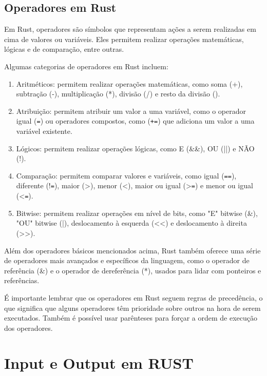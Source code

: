 \documentclass[12pt,a4paper,oneside]{abntex2}
\begin{document}
\subsection{Operadores em Rust}

Em Rust, operadores são símbolos que representam ações a serem realizadas em cima de valores ou variáveis. Eles permitem realizar operações matemáticas, lógicas e de comparação, entre outras.

Algumas categorias de operadores em Rust incluem:

\begin{enumerate}
    \item Aritméticos: permitem realizar operações matemáticas, como soma (+), subtração (-), multiplicação (*), divisão (/) e resto da divisão ().

\item Atribuição: permitem atribuir um valor a uma variável, como o operador igual (\texttt{=}) ou operadores compostos, como (\texttt{+=}) que adiciona um valor a uma variável existente.

\item Lógicos: permitem realizar operações lógicas, como E (\&\&), OU (||) e NÃO (!).

\item Comparação: permitem comparar valores e variáveis, como igual (\texttt{==}), diferente (!\texttt{=}), maior (>), menor (<), maior ou igual (>\texttt{=}) e menor ou igual (<\texttt{=}).

\item Bitwise: permitem realizar operações em nível de bits, como "E" bitwise (\&), "OU" bitwise (|), deslocamento à esquerda (<<) e deslocamento à direita (>>).
\end{enumerate}


Além dos operadores básicos mencionados acima, Rust também oferece uma série de operadores mais avançados e específicos da linguagem, como o operador de referência (\&) e o operador de dereferência (*), usados para lidar com ponteiros e referências.

É importante lembrar que os operadores em Rust seguem regras de precedência, o que significa que alguns operadores têm prioridade sobre outros na hora de serem executados. Também é possível usar parênteses para forçar a ordem de execução dos operadores.


\section{Input e Output em RUST }
\end{document}
